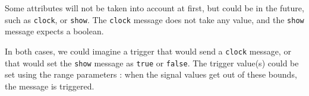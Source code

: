 \documentclass[a4paper]{article}
\newcommand{\OSC}[1]		{\texttt{#1}}
\begin{document}
Some attributes will not be taken into account at first, but could be in the future, such as \OSC{clock}, or \OSC{show}. The \OSC{clock} message does not take any value, and the \OSC{show} message expects a boolean.

In both cases, we could imagine a trigger that would send a \OSC{clock} message, or that would set the \OSC{show} message as \OSC{true} or \OSC{false}. The trigger value(s) could be set using the range parameters : when the signal values get out of these bounds, the message is triggered.
\\



%
\end{document}
